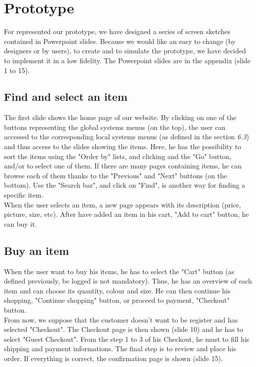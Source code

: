 \section{Prototype}

For represented our prototype, we have designed a series of screen sketches contained in Powerpoint slides. Because we would like an easy to change (by designers or by users), to create and to simulate the prototype, we have decided to implement it in a low fidelity. The Powerpoint slides are in the appendix (slide 1 to 15).

\subsection{Find and select an item}
The first slide shows the home page of our website. By clicking on one of the buttons representing the global systems menus (on the top), the user can accessed to the corresponding local systems menus (as defined in the section \textit{6.3}) and thus access to the slides showing the items. Here, he has the possibility to sort the items using the "Order by" lists, and clicking and the "Go" button, and/or to select one of them. If there are many pages containing items, he can browse each of them thanks to the "Previous" and "Next" buttons (on the bottom). Use the "Search bar", and click on "Find", is another way for finding a specific item. \\

When the user selects an item, a new page appears with its description (price, picture, size, etc). After have added an item in his cart, "Add to cart" button, he can buy it.

\subsection{Buy an item}
When the user want to buy his items, he has to select the "Cart" button (as defined previously, be logged is not mandatory). Thus, he has an overview of each item and can choose its quantity, colour and size. He can then continue his shopping, "Continue shopping" button, or proceed to payment, "Checkout" button. \\

From now, we suppose that the customer doesn't want to be register and has selected "Checkout". The Checkout page is then shown (slide 10) and he has to select "Guest Checkout". From the step 1 to 3 of his Checkout, he must to fill his shipping and payment informations. The final step is to review and place his order. If everything is correct, the confirmation page is shown (slide 15).
